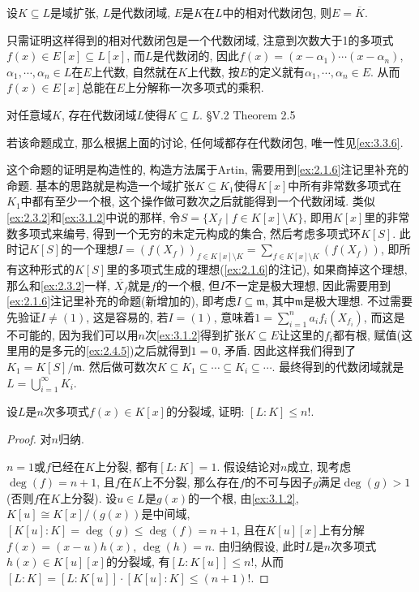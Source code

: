 \begin{remark}
    \begin{propstar}
        设$K \subseteq L$是域扩张, $L$是代数闭域, $E$是$K$在$L$中的相对代数闭包, 则$E = \overline{K}$.
    \end{propstar}
    只需证明这样得到的相对代数闭包是一个代数闭域, 注意到次数大于1的多项式$f(x) \in E[x] \subseteq L[x]$, 而$L$是代数闭的, 因此$f(x) = (x - \alpha_1) \cdots (x - \alpha_n)$, $\alpha_1, \cdots, \alpha_n \in L$在$E$上代数, 自然就在$K$上代数, 按$E$的定义就有$\alpha_1, \cdots, \alpha_n \in E$. 从而$f(x) \in E[x]$总能在$E$上分解称一次多项式的乘积.

    \begin{propstar}
        对任意域$K$, 存在代数闭域$L$使得$K \subseteq L$. \cite{lang2012algebra}\S V.2 Theorem 2.5
    \end{propstar}
    若该命题成立, 那么根据上面的讨论, 任何域都存在代数闭包, 唯一性见\ref{ex:3.3.6}.

    这个命题的证明是构造性的, 构造方法属于Artin, 需要用到\ref{ex:2.1.6}注记里补充的命题. 基本的思路就是构造一个域扩张$K \subseteq K_1$使得$K[x]$中所有非常数多项式在$K_1$中都有至少一个根, 这个操作做可数次之后就能得到一个代数闭域. 类似\ref{ex:2.3.2}和\ref{ex:3.1.2}中说的那样, 令$S = \{X_f \mid f \in K[x] \setminus K\}$, 即用$K[x]$里的非常数多项式来编号, 得到一个无穷的未定元构成的集合, 然后考虑多项式环$K[S]$. 此时记$K[S]$的一个理想$I = (f(X_f))_{f \in K[x] \setminus K} = \sum_{f \in K[x] \setminus K} (f(X_f))$, 即所有这种形式的$K[S]$里的多项式生成的理想(\ref{ex:2.1.6}的注记), 如果商掉这个理想, 那么和\ref{ex:2.3.2}一样, $\overline{X_f}$就是$f$的一个根, 但$I$不一定是极大理想, 因此需要用到\ref{ex:2.1.6}注记里补充的命题(新增加的), 即考虑$I \subseteq \mathfrak{m}$, 其中$\mathfrak{m}$是极大理想. 不过需要先验证$I \neq (1)$, 这是容易的, 若$I = (1)$, 意味着$1 = \sum_{i = 1}^{n} a_if_i(X_{f_i})$, 而这是不可能的, 因为我们可以用$n$次\ref{ex:3.1.2}得到扩张$K \subseteq E$让这里的$f_i$都有根, 赋值(这里用的是多元的\ref{ex:2.4.5})之后就得到$1 = 0$, 矛盾. 因此这样我们得到了$K_1 = K[S]/\mathfrak{m}$. 然后做可数次$K \subseteq K_1 \subseteq \cdots \subseteq K_i \subseteq \cdots$. 最终得到的代数闭域就是$L = \bigcup_{i = 1}^{\infty} K_i$.
\end{remark}

\begin{problem}
    设$L$是$n$次多项式$f(x) \in K[x]$的分裂域, 证明: $[L:K] \leqslant n!$.
\end{problem}

\begin{proof}
    对$n$归纳.

    $n = 1$或$f$已经在$K$上分裂, 都有$[L:K] = 1$. 假设结论对$n$成立, 现考虑$\deg(f) = n + 1$, 且$f$在$K$上不分裂, 那么存在$f$的不可与因子$g$满足$\deg(g) > 1$(否则$f$在$K$上分裂). 设$u \in L$是$g(x)$的一个根, 由\ref{ex:3.1.2}, $K[u] \cong K[x]/(g(x))$是中间域, $[K[u]:K] = \deg(g) \leqslant \deg(f) = n + 1$, 且在$K[u][x]$上有分解$f(x) = (x - u)h(x)$, $\deg(h) = n$. 由归纳假设, 此时$L$是$n$次多项式$h(x) \in K[u][x]$的分裂域, 有$[L:K[u]] \leqslant n!$, 从而$[L:K] = [L:K[u]] \cdot [K[u]:K] \leqslant (n + 1)!$.
\end{proof}


